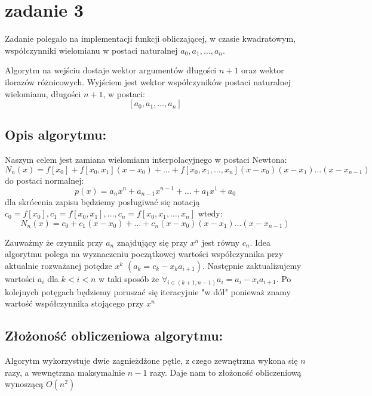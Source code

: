 \section{zadanie 3}
Zadanie polegało na implementacji funkcji obliczającej, w czasie kwadratowym, współczynniki wielomianu w postaci naturalnej \(a_0, a_1, \ldots, a_n\).

Algorytm na wejściu dostaje wektor argumentów długości \(n + 1\) oraz wektor ilorazów różnicowych.
Wyjściem jest wektor współczyników postaci naturalnej wielomianu, długości \(n + 1\), w postaci: 
\[ [a_0, a_1, \ldots, a_n] \]
\subsection{Opis algorytmu: }
Naszym celem jest zamiana wielomianu interpolacyjnego w postaci Newtona:
\[N_n(x) = f[x_0] + f[x_0, x_1](x - x_0) + \ldots + f[x_0, x_1, \ldots, x_n](x - x_0)(x - x_1)\ldots(x - x_{n-1})\]
do postaci normalnej:
\[p(x) = a_nx^n + a_{n-1}x^{n-1} + \ldots + a_1x^1 + a_0\]
dla skrócenia zapisu będziemy posługiwać się notacją \(c_0 = f[x_0], c_1 = f[x_0, x_1], \ldots, c_n = f[x_0, x_1, \ldots, x_n]\) wtedy:
\[N_n(x) = c_0 + c_1(x - x_0) + \ldots + c_n(x - x_0)(x - x_1)\ldots(x - x_{n-1})\]

Zauważmy że czynnik przy \(a_n\) znajdujący się przy \(x^n\) jest równy \(c_n\).
Idea algorytmu polega na wyznaczeniu początkowej wartości współczynnika przy aktualnie rozważanej potędze \(x^k\) \( (a_k = c_k - x_ka_{i+1} ) \). Następnie zaktualizujemy wartości \(a_i\) dla \(k < i < n \) w taki sposób że \( \forall_{i \in (k + 1, n - 1)} a_i = a_i - x_ia_{i + 1} \). Po kolejnych potęgach będziemy poruszać się iteracyjnie "w dół" ponieważ znamy wartość współczynnika stojącego przy \(x^n\)

\subsection{Złożoność obliczeniowa algorytmu: }
Algorytm wykorzystuje dwie zagnieżdżone pętle, z czego zewnętrzna wykona się \(n\) razy, a wewnętrzna maksymalnie \(n-1\) razy. Daje nam to złożoność obliczeniową wynoszącą \(O(n^2)\)

